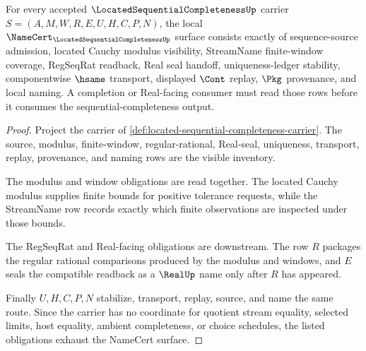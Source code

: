 \begin{theorem}
\label{thm:located-sequential-completeness-namecert-obligations}
For every accepted $\LocatedSequentialCompletenessUp$ carrier $S=(A,M,W,R,E,U,H,C,P,N)$, the local $\NameCert_{\LocatedSequentialCompletenessUp}$ surface consists exactly of sequence-source admission, located Cauchy modulus visibility, StreamName finite-window coverage, RegSeqRat readback, Real seal handoff, uniqueness-ledger stability, componentwise $\hsame$ transport, displayed $\Cont$ replay, $\Pkg$ provenance, and local naming. A completion or Real-facing consumer must read those rows before it consumes the sequential-completeness output.
\end{theorem}
\begin{proof}
Project the carrier of \autoref{def:located-sequential-completeness-carrier}. The source, modulus, finite-window, regular-rational, Real-seal, uniqueness, transport, replay, provenance, and naming rows are the visible inventory.

The modulus and window obligations are read together. The located Cauchy modulus supplies finite bounds for positive tolerance requests, while the StreamName row records exactly which finite observations are inspected under those bounds.

The RegSeqRat and Real-facing obligations are downstream. The row $R$ packages the regular rational comparisons produced by the modulus and windows, and $E$ seals the compatible readback as a $\RealUp$ name only after $R$ has appeared.

Finally $U,H,C,P,N$ stabilize, transport, replay, source, and name the same route. Since the carrier has no coordinate for quotient stream equality, selected limits, host equality, ambient completeness, or choice schedules, the listed obligations exhaust the NameCert surface.
\end{proof}

